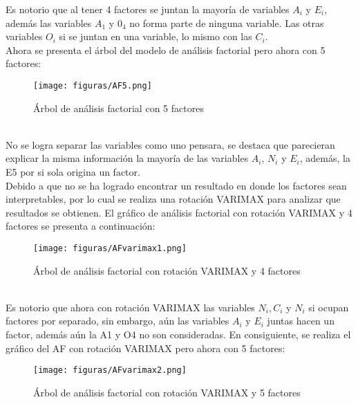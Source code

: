 \documentclass{report}
\begin{document}
Es notorio que al tener 4 factores se juntan la mayoría de variables $A_{i}$ y $E_{i}$, además las variables $A_{1}$ y $0_{4}$ no forma parte de ninguna variable. Las otras variables $O_{i}$ si se juntan en una variable, lo mismo con las $C_{i}$. \\

Ahora se presenta el árbol del modelo de análisis factorial pero ahora con 5 factores:\\
\vspace{4cm}

\begin{figure}[htp]
        \centering
    	\texttt{[image: figuras/AF5.png]}
    	\caption{Árbol de análisis factorial con 5 factores}
    	\label{fig: Figura1}
\end{figure}\\

No se logra separar las variables como uno pensara, se destaca que parecieran explicar la misma información la mayoría de las variables $A_{i}$, $N_{i}$ y $E_{i}$, además, la E5 por si sola origina un factor.\\

Debido a que no se ha logrado encontrar un resultado en donde los factores sean interpretables, por lo cual se realiza una rotación VARIMAX para analizar que resultados se obtienen. El gráfico de análisis factorial con rotación VARIMAX y 4 factores se presenta a continuación:\\

\begin{figure}[htp]
        \centering
    	\texttt{[image: figuras/AFvarimax1.png]}
    	\caption{Árbol de análisis factorial con rotación VARIMAX y 4 factores}
    	\label{fig: Figura1}
\end{figure}\\

Es notorio que ahora con rotación VARIMAX las variables $N_{i},C_{i}$ y $N_{i}$ si ocupan factores por separado, sin embargo, aún las variables $A_{i}$ y $E_{i}$ juntas hacen un factor, además aún la A1 y O4 no son consideradas. En consiguiente, se realiza el gráfico del AF con rotación VARIMAX pero ahora con 5 factores:\\
\vspace{4cm}

\begin{figure}[htp]
        \centering
    	\texttt{[image: figuras/AFvarimax2.png]}
    	\caption{Árbol de análisis factorial con rotación VARIMAX y 5 factores}
    	\label{fig: Figura1}
\end{figure}\\
\end{document}
